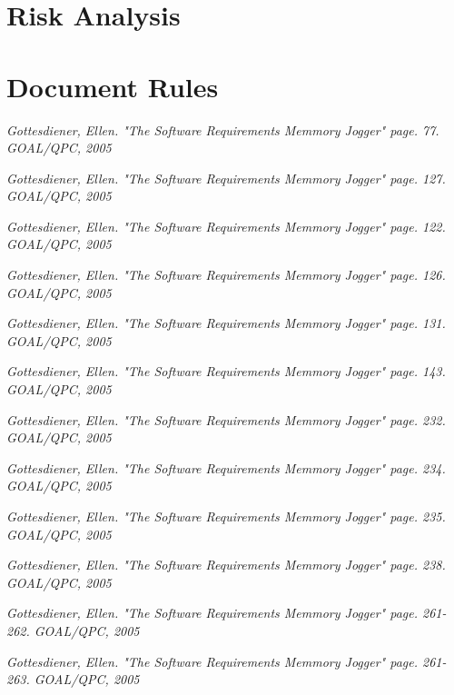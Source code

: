 \documentclass[a4paper]{article}
\begin{document}
\section{Risk Analysis}
\label{sec:risk_analysis}

\section{Document Rules} 
\label{sec:document_rules}



\begin{thebibliography}{99}     
	
 \emph{Gottesdiener, Ellen. \textsl{"The Software Requirements Memmory Jogger" page. 77}. GOAL/QPC, 2005}

 \emph{Gottesdiener, Ellen. \textsl{"The Software Requirements Memmory Jogger" page. 127}. GOAL/QPC, 2005}

 \emph{Gottesdiener, Ellen. \textsl{"The Software Requirements Memmory Jogger" page. 122}. GOAL/QPC, 2005}

 \emph{Gottesdiener, Ellen. \textsl{"The Software Requirements Memmory Jogger" page. 126}. GOAL/QPC, 2005}

 \emph{Gottesdiener, Ellen. \textsl{"The Software Requirements Memmory Jogger" page. 131}. GOAL/QPC, 2005}

 \emph{Gottesdiener, Ellen. \textsl{"The Software Requirements Memmory Jogger" page. 143}. GOAL/QPC, 2005}

 \emph{Gottesdiener, Ellen. \textsl{"The Software Requirements Memmory Jogger" page. 232}. GOAL/QPC, 2005}

 \emph{Gottesdiener, Ellen. \textsl{"The Software Requirements Memmory Jogger" page. 234}. GOAL/QPC, 2005}

 \emph{Gottesdiener, Ellen. \textsl{"The Software Requirements Memmory Jogger" page. 235}. GOAL/QPC, 2005}

 \emph{Gottesdiener, Ellen. \textsl{"The Software Requirements Memmory Jogger" page. 238}. GOAL/QPC, 2005}

 \emph{Gottesdiener, Ellen. \textsl{"The Software Requirements Memmory Jogger" page. 261-262}. GOAL/QPC, 2005}

 \emph{Gottesdiener, Ellen. \textsl{"The Software Requirements Memmory Jogger" page. 261-263}. GOAL/QPC, 2005}


\end{thebibliography}
\end{document}
